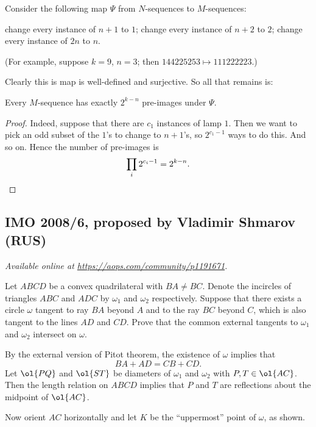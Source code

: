 \documentclass[11pt]{scrartcl}
\begin{document}
Consider the following map $\Psi$ from $N$-sequences to $M$-sequences:
\begin{itemize}
  \ii change every instance of $n+1$ to $1$;
  \ii change every instance of $n+2$ to $2$;
  \ii[$\vdots$]
  \ii change every instance of $2n$ to $n$.
\end{itemize}
(For example, suppose $k=9$, $n=3$;
then $144225253 \mapsto 111222223$.)

Clearly this is map is well-defined and surjective.
So all that remains is:
\begin{claim*}
  Every $M$-sequence has exactly $2^{k-n}$ pre-images under $\Psi$.
\end{claim*}
\begin{proof}
  Indeed, suppose that there are $c_1$ instances of lamp $1$.
  Then we want to pick an odd subset of the $1$'s to change to $n+1$'s,
  so $2^{c_1 - 1}$ ways to do this.
  And so on.
  Hence the number of pre-images is
  \[ \prod_i 2^{c_i - 1} = 2^{k-n}. \qedhere \]
\end{proof}
\pagebreak

\subsection{IMO 2008/6, proposed by Vladimir Shmarov (RUS)}
\textsl{Available online at \url{https://aops.com/community/p1191671}.}
\begin{mdframed}[style=mdpurplebox,frametitle={Problem statement}]
Let $ABCD$ be a convex quadrilateral with $BA \neq BC$.
Denote the incircles of triangles $ABC$ and $ADC$
by $\omega_1$ and $\omega_2$ respectively.
Suppose that there exists a circle $\omega$ tangent
to ray $BA$ beyond $A$ and to the ray $BC$ beyond $C$,
which is also tangent to the lines $AD$ and $CD$.
Prove that the common external tangents to
$\omega_1$ and $\omega_2$ intersect on $\omega$.
\end{mdframed}
By the external version of Pitot theorem, the existence
of $\omega$ implies that
\[ BA + AD = CB + CD. \]
Let $\ol{PQ}$ and $\ol{ST}$ be diameters of $\omega_1$ and $\omega_2$
with $P, T \in \ol{AC}$.
Then the length relation on $ABCD$ implies that $P$ and $T$
are reflections about the midpoint of $\ol{AC}$.

Now orient $AC$ horizontally and let $K$ be the ``uppermost'' point of $\omega$, as shown.
\end{document}
